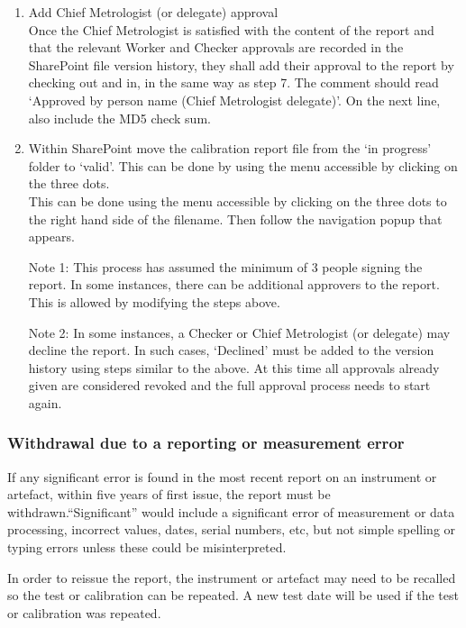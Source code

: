 \begin{enumerate}
\item Add Chief Metrologist (or delegate) approval
\\
Once the Chief Metrologist is satisfied with the content of the report and that the relevant Worker and Checker approvals are recorded in the SharePoint file version history, they shall add their approval to the report by checking out and in, in the same way as step 7.  The comment should read ‘Approved by person name (Chief Metrologist delegate)’.  On the next line, also include the MD5 check sum.

\item Within SharePoint move the calibration report file from the ‘in progress’ folder to ‘valid’.  This can be done by using the menu accessible by clicking on the three dots.
\\This can be done using the menu accessible by clicking on the three dots to the right hand side of the filename.  Then follow the navigation popup that appears.

Note 1:  This process has assumed the minimum of 3 people signing the report.  In some instances, there can be additional approvers to the report.  This is allowed by modifying the steps above.

Note 2:  In some instances, a Checker or Chief Metrologist (or delegate) may decline the report.  In such cases, ‘Declined’ must be added to the version history using steps similar to the above.  At this time all approvals already given are considered revoked and the full approval process needs to start again.
\end{enumerate}



\subsubsection{Withdrawal due to a reporting or measurement error}
\label{sss:reissue_report}
If any significant error is found in the most recent report on an instrument or artefact, within five years of first issue, the report must be withdrawn.``Significant'' would include a significant error of measurement or data processing, incorrect values, dates, serial numbers, etc, but not simple spelling or typing errors unless these could be misinterpreted.

In order to reissue the report, the instrument or artefact may need to be recalled so the test or calibration can be repeated. A new test date will be used if the test or calibration was repeated.

